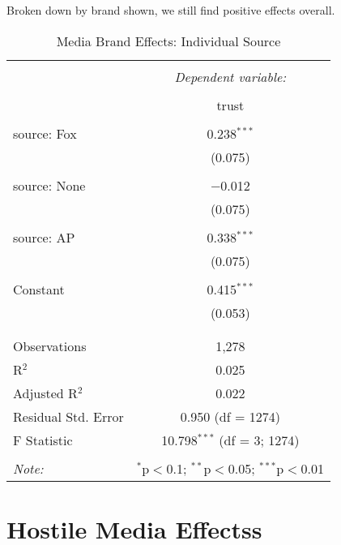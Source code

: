 Broken down by brand shown, we still find positive effects overall.
\begin{table}[!htbp] \centering 
  \caption{Media Brand Effects: Individual Source} 
  \label{} 
    \begin{tabular}{@{\extracolsep{5pt}}lc} 
    \\[-1.8ex]\hline 
    \hline \\[-1.8ex] 
     & \multicolumn{1}{c}{\textit{Dependent variable:}} \\ 
    \cline{2-2} 
    \\[-1.8ex] & trust \\ 
    \hline \\[-1.8ex] 
     source: Fox & 0.238$^{***}$ \\ 
      & (0.075) \\ 
      & \\ 
     source: None & $-$0.012 \\ 
      & (0.075) \\ 
      & \\ 
     source: AP & 0.338$^{***}$ \\ 
      & (0.075) \\ 
      & \\ 
     Constant & 0.415$^{***}$ \\ 
      & (0.053) \\ 
      & \\ 
    \hline \\[-1.8ex] 
    Observations & 1,278 \\ 
    R$^{2}$ & 0.025 \\ 
    Adjusted R$^{2}$ & 0.022 \\ 
    Residual Std. Error & 0.950 (df = 1274) \\ 
    F Statistic & 10.798$^{***}$ (df = 3; 1274) \\ 
    \hline 
    \hline \\[-1.8ex] 
    \textit{Note:}  & \multicolumn{1}{r}{$^{*}$p$<$0.1; $^{**}$p$<$0.05; $^{***}$p$<$0.01} \\ 
    \end{tabular} 
\end{table} 
\newpage







\section{Hostile Media Effectss}
 

